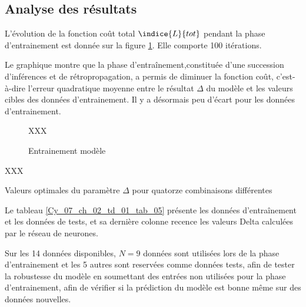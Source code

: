 \subsection*{Analyse des résultats}
L'évolution de la fonction coût total $\indice{L}{tot}$ pendant la phase d'entrainement est donnée sur la figure \ref{Cy_07_ch_02_td_01_fig_19}. Elle comporte 100 itérations. 


Le graphique montre que la phase d'entraînement,constituée d'une succession d'inférences et de rétropropagation, a permis de diminuer la fonction coût, c'est-à-dire l'erreur quadratique moyenne entre le résultat $\Delta$ du modèle et les valeurs cibles des données d'entrainement. Il y a désormais peu d'écart pour les données d'entrainement.

\begin{figure}[!h]
\centering
XXX
\caption{Entrainement modèle\label{Cy_07_ch_02_td_01_fig_19}}
\end{figure}


\begin{table}[!h]
\centering
XXX
\caption{Valeurs optimales du paramètre $\Delta$ pour quatorze combinaisons différentes \label{Cy_07_ch_02_td_01_tab_05}}
\end{table}


Le tableau \ref{Cy_07_ch_02_td_01_tab_05} présente les données d'entraînement et les données de tests, et sa dernière colonne recence les valeurs Delta calculées par le réseau de neurones.

Sur les 14 données disponibles, $N=9$ données sont utilisées lors de la phase d'entrainement et les 5 autres sont reservées comme données tests, afin de tester la robustesse du modèle en soumettant des entrées non utilisées pour la phase d'entrainement, afin de vérifier si la prédiction du modèle est bonne même sur des données nouvelles. 

\ifprof
\begin{corrige}
\end{corrige}
\else
\fi

\ifprof
\begin{corrige}
\end{corrige}
\else
\fi

\ifprof
\begin{corrige}
\end{corrige}
\else
\fi

